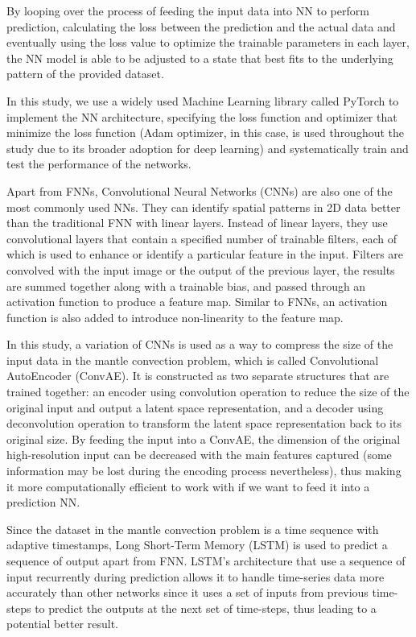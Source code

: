 By looping over the process of feeding the input data into NN to perform prediction, calculating the loss between the prediction and the actual data and eventually using the loss value to optimize the trainable parameters in each layer, the NN model is able to be adjusted to a state that best fits to the underlying pattern of the provided dataset.

In this study, we use a widely used Machine Learning library called PyTorch \citep{paszke2019pytorch} to implement the NN architecture, specifying the loss function and optimizer that minimize the loss function (Adam optimizer, in this case, is used throughout the study due to its broader adoption for deep learning) and systematically train and test the performance of the networks.

Apart from FNNs, Convolutional Neural Networks (CNNs) are also one of the most commonly used NNs. They can identify 
spatial patterns in 2D data better than the traditional FNN with linear layers. Instead of linear layers, they use convolutional layers that contain a specified number of trainable filters, each of which is used to enhance or identify a particular feature in the input. Filters are convolved with the input image or the output of the previous layer, the results are summed together along with a trainable bias, and passed through an activation function to produce a feature map. Similar to FNNs, an activation function is also added to introduce non-linearity to the feature map.

In this study, a variation of CNNs is used as a way to compress the size of the input data in the mantle convection problem, which is called Convolutional AutoEncoder (ConvAE). It is constructed as two separate structures that are trained together: an encoder using convolution operation to reduce the size of the original input and output a latent space representation, and a decoder using deconvolution operation to transform the latent space representation back to its original size. By feeding the input into a ConvAE, the dimension of the original high-resolution input can be decreased with the main features captured (some information may be lost during the encoding process nevertheless), thus making it more computationally efficient to work with if we want to feed it into a prediction NN.

Since the dataset in the mantle convection problem is a time sequence with adaptive timestamps, Long Short-Term Memory (LSTM) is used to predict a sequence of output apart from FNN. LSTM's architecture that use a sequence of input recurrently during prediction allows it to handle time-series data more accurately than other networks since it uses a set of inputs from previous time-steps to predict the outputs at the next set of time-steps, thus leading to a potential better result. \citep{10.1162_neco.1997.9.8.1735}


